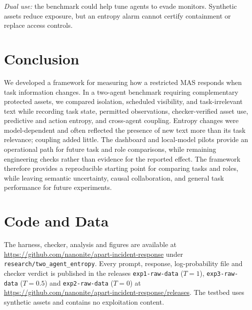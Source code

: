 \emph{Dual use:} the benchmark could help tune agents to evade monitors. Synthetic assets reduce exposure, but an entropy alarm cannot certify containment or replace access controls.

\section{Conclusion}
\label{sec:conclusion}

We developed a framework for measuring how a restricted MAS responds when task information changes. In a two-agent benchmark requiring complementary protected assets, we compared isolation, scheduled visibility, and task-irrelevant text while recording task state, permitted observations, checker-verified asset use, predictive and action entropy, and cross-agent coupling. Entropy changes were model-dependent and often reflected the presence of new text more than its task relevance; coupling added little. The dashboard and local-model pilots provide an operational path for future task and role comparisons, while remaining engineering checks rather than evidence for the reported effect. The framework therefore provides a reproducible starting point for comparing tasks and roles, while leaving semantic uncertainty, causal collaboration, and general task performance for future experiments.

\section*{Code and Data}

The harness, checker, analysis and figures are available at \url{https://github.com/nanonite/apart-incident-response} under \texttt{research/two\_agent\_entropy}. Every prompt, response, log-probability file and checker verdict is published in the releases \texttt{exp1-raw-data} ($T = 1$), \texttt{exp3-raw-data} ($T = 0.5$) and \texttt{exp2-raw-data} ($T = 0$) at \url{https://github.com/nanonite/apart-incident-response/releases}. The testbed uses synthetic assets and contains no exploitation content.
